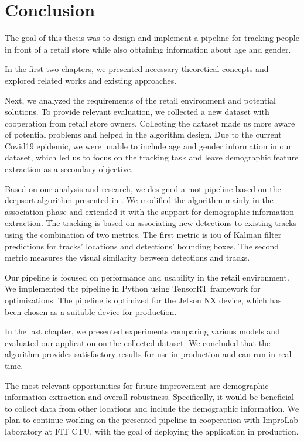 \chapter{Conclusion}

The goal of this thesis was to design and implement a  pipeline for tracking people in front of a retail store while also obtaining information about age and gender.

In the first two chapters, we presented necessary theoretical concepts and explored related works and existing approaches.

Next, we analyzed the requirements of the retail environment and potential solutions. To provide relevant evaluation, we collected a new dataset with cooperation from retail store owners. Collecting the dataset made us more aware of potential problems and helped in the algorithm design. Due to the current Covid19 epidemic, we were unable to include age and gender information in our dataset, which led us to focus on the tracking task and leave demographic feature extraction as a secondary objective.

Based on our analysis and research, we designed a \gls{mot} pipeline based on the \gls{deepsort} algorithm presented in \cite{Wojke2017_DeepSORT}. We modified the algorithm mainly in the association phase and extended it with the support for demographic information extraction. The tracking is based on associating new detections to existing tracks using the combination of two metrics. The first metric is \gls{iou} of Kalman filter predictions for tracks' locations and detections' bounding boxes. The second metric measures the visual similarity between detections and tracks.

Our pipeline is focused on performance and usability in the retail environment. We implemented the pipeline in Python using TensorRT framework for optimizations. The pipeline is optimized for the Jetson NX device, which has been chosen as a suitable device for production.

In the last chapter, we presented experiments comparing various models and evaluated our application on the collected dataset. We concluded that the algorithm provides satisfactory results for use in production and can run in real time.

The most relevant opportunities for future improvement are demographic information extraction and overall robustness. Specifically, it would be beneficial to collect data from other locations and include the demographic information. We plan to continue working on the presented pipeline in cooperation with ImproLab laboratory at FIT CTU, with the goal of deploying the application in production.


\listoftodos
